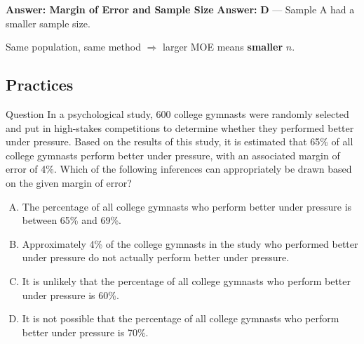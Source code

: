 \documentclass{beamer}
\begin{document}
\begin{frame}{\textbf{Answer: Margin of Error and Sample Size}}
\textbf{Answer:} \textbf{D} — Sample A had a smaller sample size.

\vspace{0.1cm}
\small
Same population, same method $\Rightarrow$ larger MOE means \textbf{smaller} $n$.
\end{frame}



\begin{frame}
\section{Practices}
\end{frame}

\begin{frame}{Question}
In a psychological study, 600 college gymnasts were randomly selected and put in high-stakes competitions to determine whether they performed better under pressure. Based on the results of this study, it is estimated that 65\% of all college gymnasts perform better under pressure, with an associated margin of error of 4\%. Which of the following inferences can appropriately be drawn based on the given margin of error?

\begin{enumerate}[A.]
    \item The percentage of all college gymnasts who perform better under pressure is between 65\% and 69\%.
    \item Approximately 4\% of the college gymnasts in the study who performed better under pressure do not actually perform better under pressure.
    \item It is unlikely that the percentage of all college gymnasts who perform better under pressure is 60\%.
    \item It is not possible that the percentage of all college gymnasts who perform better under pressure is 70\%.
\end{enumerate}
\end{frame}
\end{document}
